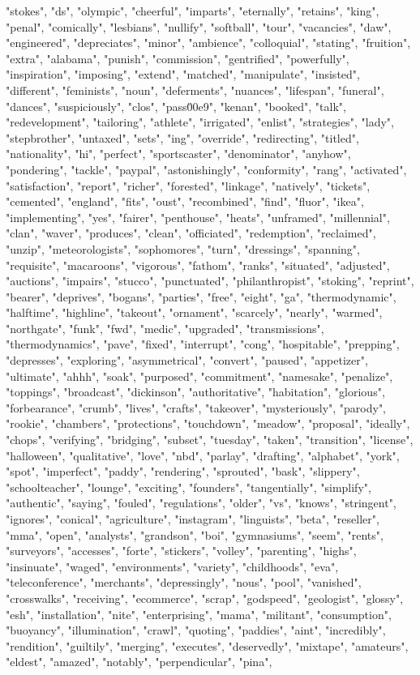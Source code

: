 "stokes", "ds", "olympic", "cheerful", "imparts", "eternally", "retains", "king", "penal", "comically", "lesbians", "nullify", "softball", "tour", "vacancies", "daw", "engineered", "depreciates", "minor", "ambience", "colloquial", "stating", "fruition", "extra", "alabama", "punish", "commission", "gentrified", "powerfully", "inspiration", "imposing", "extend", "matched", "manipulate", "insisted", "different", "feminists", "noun", "deferments", "nuances", "lifespan", "funeral", "dances", "suspiciously", "clos", "pass\u00e9", "kenan", "booked", "talk", "redevelopment", "tailoring", "athlete", "irrigated", "enlist", "strategies", "lady", "stepbrother", "untaxed", "sets", "ing", "override", "redirecting", "titled", "nationality", "hi", "perfect", "sportscaster", "denominator", "anyhow", "pondering", "tackle", "paypal", "astonishingly", "conformity", "rang", "activated", "satisfaction", "report", "richer", "forested", "linkage", "natively", "tickets", "cemented", "england", "fits", "oust", "recombined", "find", "fluor", "ikea", "implementing", "yes", "fairer", "penthouse", "heats", "unframed", "millennial", "clan", "waver", "produces", "clean", "officiated", "redemption", "reclaimed", "unzip", "meteorologists", "sophomores", "turn", "dressings", "spanning", "requisite", "macaroons", "vigorous", "fathom", "ranks", "situated", "adjusted", "auctions", "impairs", "stucco", "punctuated", "philanthropist", "stoking", "reprint", "bearer", "deprives", "bogans", "parties", "free", "eight", "ga", "thermodynamic", "halftime", "highline", "takeout", "ornament", "scarcely", "nearly", "warmed", "northgate", "funk", "fwd", "medic", "upgraded", "transmissions", "thermodynamics", "pave", "fixed", "interrupt", "cong", "hospitable", "prepping", "depresses", "exploring", "asymmetrical", "convert", "paused", "appetizer", "ultimate", "ahhh", "soak", "purposed", "commitment", "namesake", "penalize", "toppings", "broadcast", "dickinson", "authoritative", "habitation", "glorious", "forbearance", "crumb", "lives", "crafts", "takeover", "mysteriously", "parody", "rookie", "chambers", "protections", "touchdown", "meadow", "proposal", "ideally", "chops", "verifying", "bridging", "subset", "tuesday", "taken", "transition", "license", "halloween", "qualitative", "love", "nbd", "parlay", "drafting", "alphabet", "york", "spot", "imperfect", "paddy", "rendering", "sprouted", "bask", "slippery", "schoolteacher", "lounge", "exciting", "founders", "tangentially", "simplify", "authentic", "saying", "fouled", "regulations", "older", "vs", "knows", "stringent", "ignores", "conical", "agriculture", "instagram", "linguists", "beta", "reseller", "mma", "open", "analysts", "grandson", "boi", "gymnasiums", "seem", "rents", "surveyors", "accesses", "forte", "stickers", "volley", "parenting", "highs", "insinuate", "waged", "environments", "variety", "childhoods", "eva", "teleconference", "merchants", "depressingly", "nous", "pool", "vanished", "crosswalks", "receiving", "ecommerce", "scrap", "godspeed", "geologist", "glossy", "esh", "installation", "nite", "enterprising", "mama", "militant", "consumption", "buoyancy", "illumination", "crawl", "quoting", "paddies", "aint", "incredibly", "rendition", "guiltily", "merging", "executes", "deservedly", "mixtape", "amateurs", "eldest", "amazed", "notably", "perpendicular", "pina", 